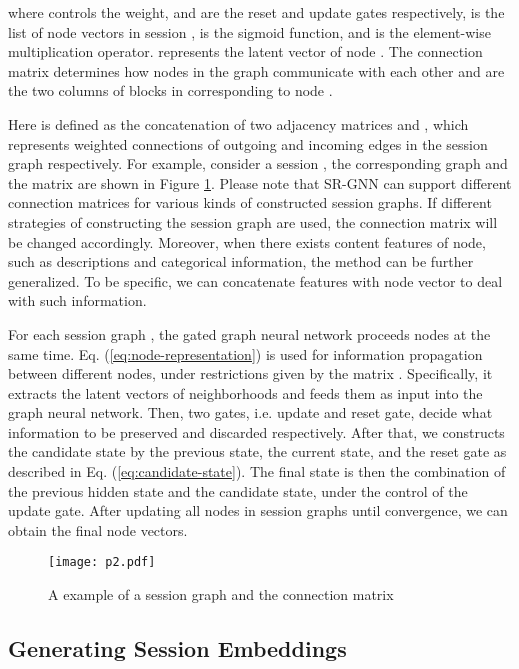 \documentclass[letterpaper]{article} \usepackage{cite}
\begin{document}
where  controls the weight,  and  are the reset and update gates respectively,  is the list of node vectors in session ,  is the sigmoid function, and  is the element-wise multiplication operator.  represents the latent vector of node . The connection matrix  determines how nodes in the graph communicate with each other and  are the two columns of blocks in  corresponding to node .

Here  is defined as the concatenation of two adjacency matrices  and , which represents weighted connections of outgoing and incoming edges in the session graph respectively. For example, consider a session , the corresponding graph  and the matrix  are shown in Figure \ref{fig:connection-matrix}. Please note that SR-GNN can support different connection matrices  for various kinds of constructed session graphs. If different strategies of constructing the session graph are used, the connection matrix  will be changed accordingly. Moreover, when there exists content features of node, such as descriptions and categorical information, the method can be further generalized. To be specific, we can concatenate features with node vector to deal with such information.

For each session graph , the gated graph neural network proceeds nodes at the same time. Eq. (\ref{eq:node-representation}) is used for information propagation between different nodes, under restrictions given by the matrix . Specifically, it extracts the latent vectors of neighborhoods and feeds them as input into the graph neural network. Then, two gates, i.e. update and reset gate, decide what information to be preserved and discarded respectively. After that, we constructs the candidate state by the previous state, the current state, and the reset gate as described in Eq. (\ref{eq:candidate-state}). The final state is then the combination of the previous hidden state and the candidate state, under the control of the update gate. After updating all nodes in session graphs until convergence, we can obtain the final node vectors.

\begin{figure}
	\centering
	\texttt{[image: p2.pdf]}
	\caption{A example of a session graph and the connection matrix }
	\label{fig:connection-matrix}
\end{figure}

\subsection{Generating Session Embeddings}
\end{document}
